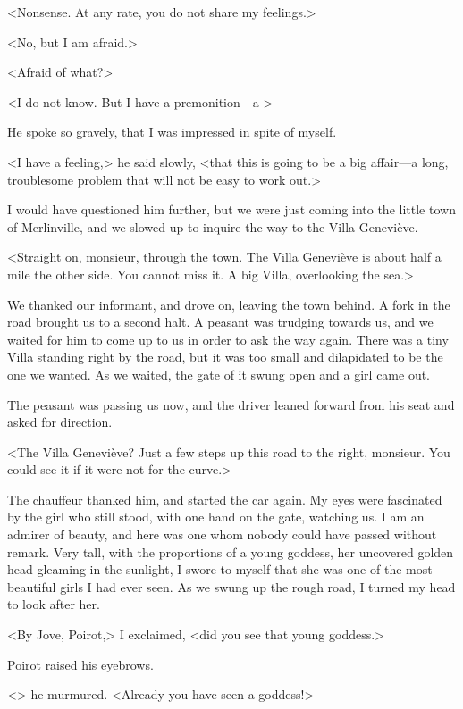  <Nonsense. At any rate, you do not share my feelings.> 

 <No, but I am afraid.> 

 <Afraid of what?> 

 <I do not know. But I have a premonition—a > 

 He spoke so gravely, that I was impressed in spite of myself. 

 <I have a feeling,> he said slowly, <that this is going to be a big affair—a long, troublesome problem that will not be easy to work out.> 

 I would have questioned him further, but we were just coming into the little town of Merlinville, and we slowed up to inquire the way to the Villa Geneviève. 

 <Straight on, monsieur, through the town. The Villa Geneviève is about half a mile the other side. You cannot miss it. A big Villa, overlooking the sea.> 

 We thanked our informant, and drove on, leaving the town behind. A fork in the road brought us to a second halt. A peasant was trudging towards us, and we waited for him to come up to us in order to ask the way again. There was a tiny Villa standing right by the road, but it was too small and dilapidated to be the one we wanted. As we waited, the gate of it swung open and a girl came out. 

 The peasant was passing us now, and the driver leaned forward from his seat and asked for direction. 

 <The Villa Geneviève? Just a few steps up this road to the right, monsieur. You could see it if it were not for the curve.> 

 The chauffeur thanked him, and started the car again. My eyes were fascinated by the girl who still stood, with one hand on the gate, watching us. I am an admirer of beauty, and here was one whom nobody could have passed without remark. Very tall, with the proportions of a young goddess, her uncovered golden head gleaming in the sunlight, I swore to myself that she was one of the most beautiful girls I had ever seen. As we swung up the rough road, I turned my head to look after her. 

 <By Jove, Poirot,> I exclaimed, <did you see that young goddess.> 

 Poirot raised his eyebrows. 

 <> he murmured. <Already you have seen a goddess!> 

